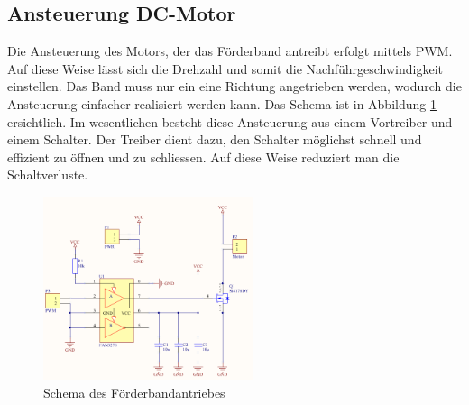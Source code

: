 \subsection{Ansteuerung DC-Motor}
\label{sec:FoerderbandAnsteuerung}
    Die Ansteuerung des Motors, der das Förderband antreibt erfolgt mittels PWM. Auf diese 
    Weise lässt sich die Drehzahl und somit die Nachführgeschwindigkeit einstellen. Das 
    Band muss nur ein eine Richtung angetrieben werden, wodurch die Ansteuerung einfacher 
    realisiert werden kann. Das Schema ist in Abbildung \ref{abb:SchemaAnsteuerung} 
    ersichtlich. Im wesentlichen besteht diese Ansteuerung aus einem Vortreiber und einem 
    Schalter. Der Treiber dient dazu, den Schalter möglichst schnell und effizient zu 
    öffnen und zu schliessen. Auf diese Weise reduziert man die Schaltverluste. 
    \begin{figure}[h!]
    	\includegraphics[width=0.55\textwidth,clip,trim=0mm 2mm 0mm 7mm]
    	{Enddokumentation/Bilder/Schema_DC-Ansteuerung.png}
    	\centering
    	\caption{Schema des Förderbandantriebes}
    	\label{abb:SchemaAnsteuerung}
    \end{figure}
    
\newpage